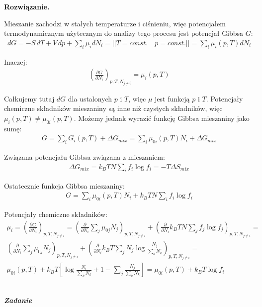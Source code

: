 \documentclass[11pt,a4paper]{article}
\newcounter{zadanie}\newcommand{\zadanie}[1][]{\addtocounter{zadanie}{1} ~\\ {\bf \emph{Zadanie \arabic{zadanie} #1 }} \\}
\newenvironment{solution}{\vspace{1cm} \par\textbf{Rozwiązanie.} \vspace{1cm}}{}
\begin{document}
\begin{solution}

Mieszanie zachodzi w stałych temperaturze i ciśnieniu, więc 
potencjałem termodynamicznym użytecznym do analizy tego procesu 
jest potencjał Gibbsa $G$:
\begin{align*}
  dG = -S\,dT + V\,dp + \sum_i \mu_i dN_i = || T=const.\quad p=const. || = \sum_i \mu_i(p,T) dN_i
\end{align*}

Inaczej:
\begin{align*}
  \left( \frac{\partial G}{\partial N_i} \right)_{p,T,N_{j\neq i}} = \mu_i(p,T)
\end{align*}

Całkujemy tutaj $dG$ dla ustalonych $p$ i $T$, 
więc $\mu$ jest funkcją $p$ i $T$. Potencjały chemiczne składników mieszaniny są
inne niż czystych składników, więc $\mu_i(p,T) \neq \mu_{0i}(p,T)$. Możemy jednak
wyrazić funkcję Gibbsa mieszaniny jako sumę:
\begin{align*}
  G = \sum_i G_i(p,T) + \Delta G_{mix} = \sum_i \mu_{0i}(p,T) N_i + \Delta G_{mix}
\end{align*}

Związana potencjału Gibbsa związana z mieszaniem:
\begin{align*}
  \Delta G_{mix} = k_B T N \sum_i f_i \log f_i = -T\Delta S_{mix}
\end{align*}

Ostatecznie funkcja Gibbsa mieszaniny:
\begin{align*}
  G = \sum_i \mu_{0i}(p,T) N_i + k_B T N \sum_i f_i \log f_i
\end{align*}


Potencjały chemiczne składników:
\begin{align*}
  \mu_i = \left( \frac{\partial G}{\partial N_i} \right)_{p,T,N_{j\neq i}} = 
  \left( \frac{\partial}{\partial N_i} \sum_j \mu_{0j} N_j \right)_{p,T,N_{j\neq i}} + 
  \left( \frac{\partial}{\partial N_i} k_B T N \sum_j f_j \log f_j \right)_{p,T,N_{j\neq i}} = \\
  \left( \frac{\partial}{\partial N_i} \sum_j \mu_{0j} N_j \right)_{p,T,N_{j\neq i}} + 
\left( \frac{\partial}{\partial N_i} k_B T \sum_j N_j \log \frac{N_j}{\sum_{k} N_k} \right)_{p,T,N_{j\neq i}} = \\
  \mu_{0i}(p,T) + k_B T \left[ \log \frac{N_i}{\sum_{k} N_k} + 1 - \sum_j \frac{N_j}{\sum_{k} N_k} \right] =
\mu_{0i}(p,T) + k_B T \log f_i 
\end{align*}


\newpage
\end{solution}
\zadanie[]
\end{document}
